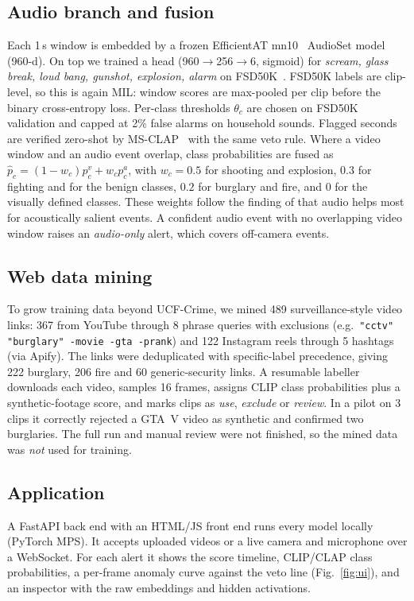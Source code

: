 \documentclass[conference,a4paper]{IEEEtran}
\begin{document}
\subsection{Audio branch and fusion}
Each 1\,s window is embedded by a frozen EfficientAT mn10~\cite{efficientat} AudioSet model (960-d). On top we
trained a head (960$\to$256$\to$6, sigmoid) for \emph{scream, glass break, loud bang, gunshot, explosion, alarm} on
FSD50K~\cite{fsd50k}. FSD50K labels are clip-level, so this is again MIL: window scores are max-pooled per clip
before the binary cross-entropy loss. Per-class thresholds $\theta_c$ are chosen on FSD50K validation and capped at
2\% false alarms on household sounds. Flagged seconds are verified zero-shot by MS-CLAP~\cite{clap} with the same
veto rule. Where a video window and an audio event overlap, class probabilities are fused as
$\hat p_c=(1-w_c)p^v_c+w_cp^a_c$, with $w_c{=}0.5$ for shooting and explosion, $0.3$ for fighting and for the benign
classes, $0.2$ for burglary and fire, and $0$ for the visually defined classes. These weights follow the finding of
\cite{xdv} that audio helps most for acoustically salient events. A confident audio event with no overlapping
video window raises an \emph{audio-only} alert, which covers off-camera events.

\subsection{Web data mining}
To grow training data beyond UCF-Crime, we mined 489 surveillance-style video links: 367 from YouTube through
8 phrase queries with exclusions (e.g.\ \texttt{"cctv" "burglary" -movie -gta -prank}) and 122 Instagram reels through
5 hashtags (via Apify). The links were deduplicated with specific-label precedence, giving 222 burglary, 206 fire
and 60 generic-security links. A resumable labeller downloads each video, samples 16 frames, assigns CLIP class
probabilities plus a synthetic-footage score, and marks clips as \emph{use}, \emph{exclude} or \emph{review}. In a
pilot on 3 clips it correctly rejected a GTA~V video as synthetic and confirmed two burglaries. The full run and
manual review were not finished, so the mined data was \emph{not} used for training.

\subsection{Application}
A FastAPI back end with an HTML/JS front end runs every model locally (PyTorch MPS). It accepts uploaded videos or a
live camera and microphone over a WebSocket. For each alert it shows the score timeline, CLIP/CLAP class
probabilities, a per-frame anomaly curve against the veto line (Fig.~\ref{fig:ui}), and an inspector with the raw
embeddings and hidden activations.
\end{document}
